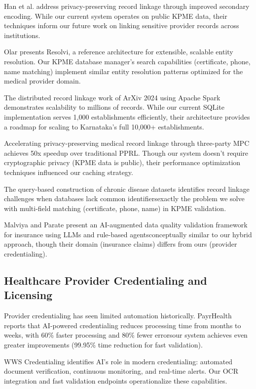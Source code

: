 \documentclass[conference]{IEEEtran}
\begin{document}
Han et al. \cite{han2025privacy} address privacy-preserving record linkage through improved secondary encoding. While our current system operates on public KPME data, their techniques inform our future work on linking sensitive provider records across institutions.

Olar \cite{olar2025resolvi} presents Resolvi, a reference architecture for extensible, scalable entity resolution. Our KPME database manager's search capabilities (certificate, phone, name matching) implement similar entity resolution patterns optimized for the medical provider domain.

The distributed record linkage work of ArXiv 2024 \cite{arxiv2024distributed} using Apache Spark demonstrates scalability to millions of records. While our current SQLite implementation serves 1,000 establishments efficiently, their architecture provides a roadmap for scaling to Karnataka's full 10,000+ establishments.

Accelerating privacy-preserving medical record linkage \cite{arxiv2024accelerating} through three-party MPC achieves 50x speedup over traditional PPRL. Though our system doesn't require cryptographic privacy (KPME data is public), their performance optimization techniques influenced our caching strategy.

The query-based construction of chronic disease datasets \cite{arxiv2024query} identifies record linkage challenges when databases lack common identifiersexactly the problem we solve with multi-field matching (certificate, phone, name) in KPME validation.

Malviya and Parate \cite{malviya2025hybrid} present an AI-augmented data quality validation framework for insurance using LLMs and rule-based agentsconceptually similar to our hybrid approach, though their domain (insurance claims) differs from ours (provider credentialing).

\subsection{Healthcare Provider Credentialing and Licensing}

Provider credentialing has seen limited automation historically. PayrHealth \cite{payrhealth2024credentialing} reports that AI-powered credentialing reduces processing time from months to weeks, with 60\% faster processing and 80\% fewer errorsour system achieves even greater improvements (99.95\% time reduction for fast validation).

WWS Credentialing \cite{wwscredentialing2024} identifies AI's role in modern credentialing: automated document verification, continuous monitoring, and real-time alerts. Our OCR integration and fast validation endpoints operationalize these capabilities.
\end{document}

